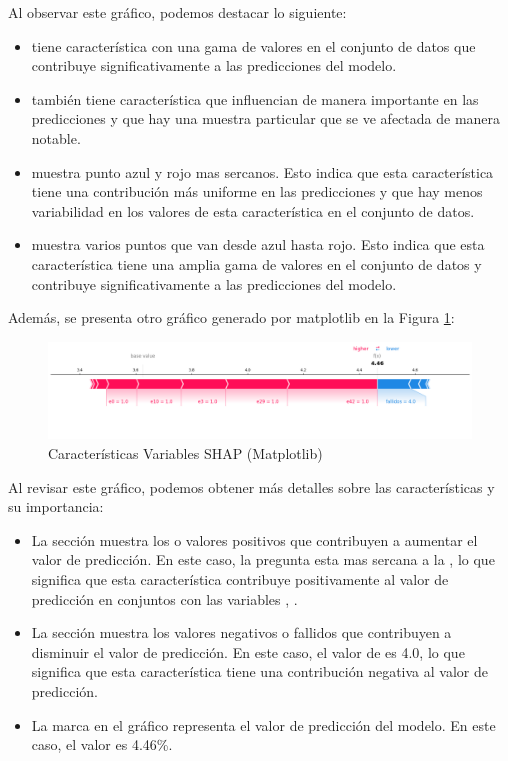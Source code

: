 Al observar este gráfico, podemos destacar lo siguiente:

\begin{itemize}
    \item {} tiene característica con una gama de valores en el conjunto de datos que contribuye significativamente a las predicciones del modelo.
    \item {} también tiene característica que influencian de manera importante en las predicciones y que hay una muestra particular que se ve afectada de manera notable.
    \item {} muestra punto azul y rojo mas sercanos. Esto indica que esta característica tiene una contribución más uniforme en las predicciones y que hay menos variabilidad en los valores de esta característica en el conjunto de datos.
    \item {} muestra varios puntos que van desde azul hasta rojo. Esto indica que esta característica tiene una amplia gama de valores en el conjunto de datos y contribuye significativamente a las predicciones del modelo.
\end{itemize}

Además, se presenta otro gráfico generado por matplotlib en la Figura \ref{fig:caract_var_shap_mat_lr2}:

\begin{figure}[H]
    \centering
    \includegraphics[width=1\textwidth]{img/shap_lr/shapForcePlot_lr2.png}
    \caption{Características Variables SHAP (Matplotlib)}
    \label{fig:caract_var_shap_mat_lr2}
\end{figure}

Al revisar este gráfico, podemos obtener más detalles sobre las características y su importancia:

\begin{itemize}
    \item La sección  muestra los  o valores positivos que contribuyen a aumentar el valor de predicción. En este caso, la pregunta  esta mas sercana a la , lo que significa que esta característica contribuye positivamente al valor de predicción en conjuntos con las variables , .
    \item La sección  muestra los valores negativos o fallidos que contribuyen a disminuir el valor de predicción. En este caso, el valor de  es 4.0, lo que significa que esta característica tiene una contribución negativa al valor de predicción.
    \item La marca  en el gráfico representa el valor de predicción del modelo. En este caso, el valor es 4.46\%.
\end{itemize}




